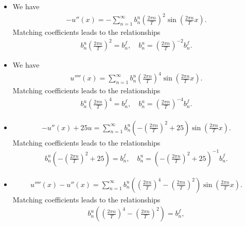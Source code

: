 \documentclass[11pt]{article}
\begin{document}
\begin{solution}   
    \begin{itemize}
     \item 
     We have 
     \begin{align*}
        -u''(x) = - \sum_{n=1}^{\infty} b_{n}^{u} \left( \frac{2\pi n}{T} \right)^{2} \sin\left( \frac{2\pi n}{T} x \right).
     \end{align*}
     Matching coefficients leads to the relationships
     \begin{align*}
        b_{n}^{u} \left( \frac{2\pi n}{T} \right)^{2} = b_{n}^{f},
        \quad 
        b_{n}^{u} = \left( \frac{2\pi n}{T} \right)^{-2} b_{n}^{f}.
     \end{align*}
     \item 
     We have 
     \begin{align*}
        u''''(x) = \sum_{n=1}^{\infty} b_{n}^{u} \left( \frac{2\pi n}{T} \right)^{4} \sin\left( \frac{2\pi n}{T} x \right).
     \end{align*}
     Matching coefficients leads to the relationships
     \begin{align*}
        b_{n}^{u} \left( \frac{2\pi n}{T} \right)^{4} = b_{n}^{f},
        \quad 
        b_{n}^{u} = \left( \frac{2\pi n}{T} \right)^{-4} b_{n}^{f}.
     \end{align*}
     \item 
     \begin{align*}
        -u''(x) + 25 u = \sum_{n=1}^{\infty} b_{n}^{u} \left( -\left( \frac{2\pi n}{T} \right)^{2} + 25 \right) \sin\left( \frac{2\pi n}{T} x \right).
     \end{align*}
     Matching coefficients leads to the relationships
     \begin{align*}
        b_{n}^{u} \left( -\left( \frac{2\pi n}{T} \right)^{2} + 25 \right) = b_{n}^{f},
        \quad 
        b_{n}^{u} = \left( -\left( \frac{2\pi n}{T} \right)^{2} + 25 \right)^{-1} b_{n}^{f}.
     \end{align*}
     \item 
     \begin{align*}
        u''''(x) - u''(x) = \sum_{n=1}^{\infty} b_{n}^{u} \left( \left( \frac{2\pi n}{T} \right)^{4} - \left( \frac{2\pi n}{T} \right)^{2} \right) \sin\left( \frac{2\pi n}{T} x \right).
     \end{align*}
     Matching coefficients leads to the relationships
     \begin{align*}
        b_{n}^{u} \left( \left( \frac{2\pi n}{T} \right)^{4} - \left( \frac{2\pi n}{T} \right)^{2} \right) = b_{n}^{f},

\end{align*}
\end{itemize}
\end{solution}
\end{document}
